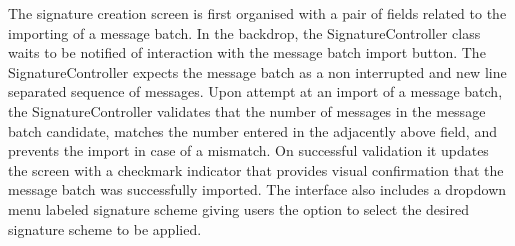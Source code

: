 \documentclass[]{final_report}
\theoremstyle{definition}
\begin{document}
The signature creation screen is first organised with a pair of fields related to the importing of a message batch. In the backdrop, the SignatureController class waits to be notified of interaction with the message batch import button. The SignatureController expects the message batch as a non interrupted and new line separated sequence of messages. Upon attempt at an import of a message batch, the SignatureController validates that the number of messages in the message batch candidate, matches the number entered in the adjacently above field, and prevents the import in case of a mismatch. On successful validation it updates the screen with a checkmark indicator that provides visual confirmation that the message batch was successfully imported. The interface also includes a dropdown menu labeled signature scheme giving users the option to select the desired signature scheme  to be applied. 
\end{document}
